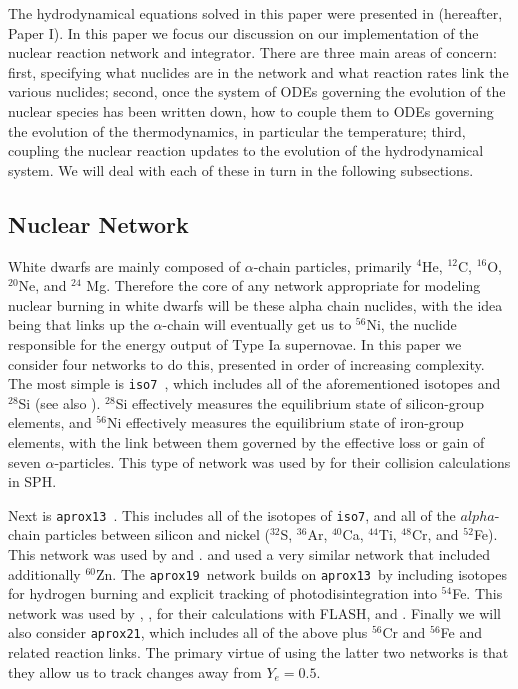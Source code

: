 \documentclass[twocolumn,numberedappendix]{../aastex6}
\newcommand{\isoseven}{\texttt{iso7}}
\newcommand{\aproxthirteen}{\texttt{aprox13}}
\newcommand{\aproxnineteen}{\texttt{aprox19}}
\newcommand{\aproxtwentyone}{\texttt{aprox21}}
\begin{document}
The hydrodynamical equations solved in this paper were presented in \citet{wdmergerI} (hereafter, Paper I).
In this paper we focus our discussion on our implementation of the nuclear
reaction network and integrator. There are three main areas of concern: first,
specifying what nuclides are in the network and what reaction rates link the
various nuclides; second, once the system of ODEs governing the evolution of
the nuclear species has been written down, how to couple them to ODEs governing
the evolution of the thermodynamics, in particular the temperature; third,
coupling the nuclear reaction updates to the evolution of the hydrodynamical
system. We will deal with each of these in turn in the following subsections.

\subsection{Nuclear Network}
\label{sec:network}

White dwarfs are mainly composed of $\alpha$-chain particles, primarily ${}^4$He,
${}^{12}$C, ${}^{16}$O, ${}^{20}$Ne, and ${}^{24}$ Mg. Therefore the core of
any network appropriate for modeling nuclear burning in white dwarfs will be
these alpha chain nuclides, with the idea being that links up the $\alpha$-chain
will eventually get us to ${}^{56}$Ni, the nuclide responsible for the
energy output of Type Ia supernovae. In this paper we consider four networks
to do this, presented in order of increasing complexity. The most simple is
\isoseven\ \citep{timmes:2000}, which includes all of the aforementioned isotopes and
${}^{28}$Si (see also \citet{hix:1998}). ${}^{28}$Si effectively measures the
equilibrium state of silicon-group elements, and ${}^{56}$Ni effectively measures
the equilibrium state of iron-group elements, with the link between them governed
by the effective loss or gain of seven $\alpha$-particles. This type of network
was used by \citet{rosswog:2009} for their collision calculations in SPH.

Next is \aproxthirteen\ \citep{timmes:1999,timmes:2000}. This includes
all of the isotopes of \isoseven, and all of the $alpha$-chain particles between
silicon and nickel (${}^{32}$S, ${}^{36}$Ar, ${}^{40}$Ca, ${}^{44}$Ti, ${}^{48}$Cr,
and ${}^{52}$Fe). This network was used by \citet{hawley:2012} and \citet{raskin:2010}.
\citet{loren-aguilar:2010} and \citet{garcia-senz:2013} used a very similar network
that included additionally ${}^{60}$Zn. The \aproxnineteen\ network \citep{timmes:1999}
builds on \aproxthirteen\ by including isotopes for hydrogen burning and explicit
tracking of photodisintegration into ${}^{54}$Fe. This network was used by
\citet{kushnir:2013}, \citet{kushnir:2014}, \citet{rosswog:2009} for their
calculations with FLASH, and \citet{papish:2015}. Finally we will also
consider \aproxtwentyone, which includes all of the above plus ${}^{56}$Cr
and ${}^{56}$Fe and related reaction links. The primary virtue of using
the latter two networks is that they allow us to track changes away from
$Y_e = 0.5$.
\end{document}
